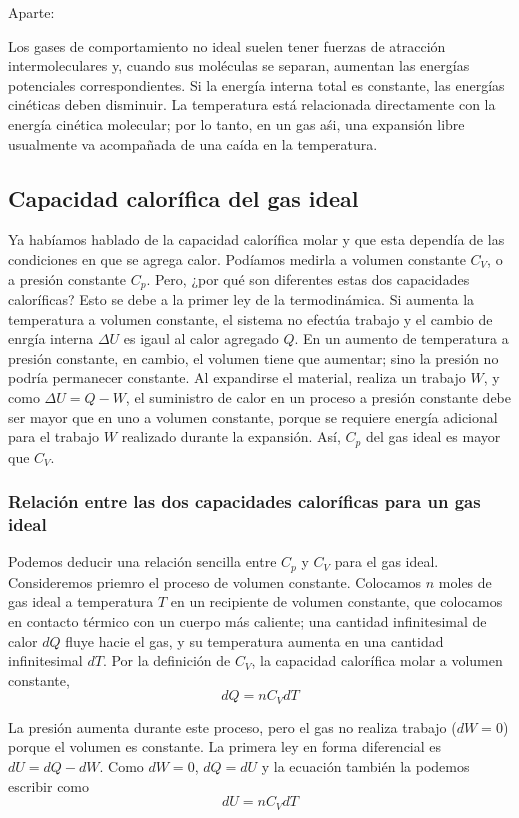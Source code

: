 \documentclass[12pt]{article}
\begin{document}
  Aparte:

  Los gases de comportamiento no ideal suelen tener fuerzas de atracción intermoleculares y, cuando sus moléculas se separan, aumentan las energías potenciales correspondientes. Si la energía interna total es constante, las energías cinéticas deben disminuir. La temperatura está relacionada directamente con la energía cinética molecular; por lo tanto, en un gas aśi, una expansión libre usualmente va acompañada de una caída en la temperatura.

  \subsection{Capacidad calorífica del gas ideal}
  Ya habíamos hablado de la capacidad calorífica molar y que esta dependía de las condiciones en que se agrega calor. Podíamos medirla a volumen constante $ C_{V} $, o a presión constante $ C_{p} $. Pero, ¿por qué son diferentes estas dos capacidades caloríficas? Esto se debe a la primer ley de la termodinámica. Si aumenta la temperatura a volumen constante, el sistema no efectúa trabajo y el cambio de enrgía interna $ \Delta U $ es igaul al calor agregado $ Q $. En un aumento de temperatura a presión constante, en cambio, el volumen tiene que aumentar; sino la presión no podría permanecer constante. Al expandirse el material, realiza un trabajo $ W $, y como $ \Delta U = Q - W $, el suministro de calor en un proceso a presión constante debe ser mayor que en uno a volumen constante, porque se requiere energía adicional para el trabajo $ W $ realizado durante la expansión. Así, $ C_{p} $ del gas ideal es mayor que $ C_{V} $.

  \subsubsection{Relación entre las dos capacidades caloríficas para un gas ideal}
  Podemos deducir una relación sencilla entre $ C_{p} $ y $ C_{V} $ para el gas ideal. Consideremos priemro el proceso de volumen constante. Colocamos $ n $ moles de gas ideal a temperatura $ T $ en un recipiente de volumen constante, que colocamos en contacto térmico con un cuerpo más caliente; una cantidad infinitesimal de calor $ dQ $ fluye hacie el gas, y su temperatura aumenta en una cantidad infinitesimal $ dT $. Por la definición de $ C_{V} $, la capacidad calorífica molar a volumen constante,
  \[
  dQ = nC_{V}dT
  \]

  La presión aumenta durante este proceso, pero el gas no realiza trabajo ($ dW = 0 $) porque el volumen es constante. La primera ley en forma diferencial es $ dU = dQ - dW $. Como $ dW = 0 $, $ dQ = dU $ y la ecuación también la podemos escribir como 
  \[
  dU = nC_{V}dT
  \]
\end{document}
